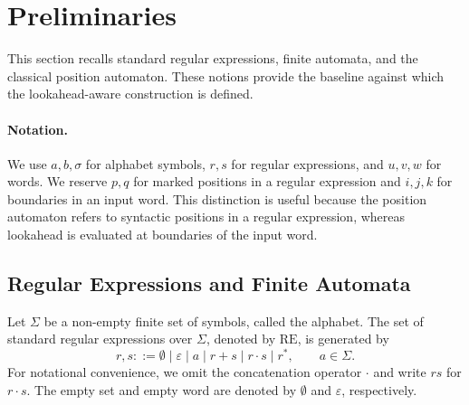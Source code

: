 \section{Preliminaries}
\label{sec:preliminaries}

This section recalls standard regular expressions, finite automata,
and the classical position automaton.  These notions provide the
baseline against which the lookahead-aware construction is defined.

\paragraph{Notation.}
We use \(a,b,\sigma\) for alphabet symbols, \(r,s\) for regular expressions, and \(u,v,w\) for words. We reserve \(p,q\) for marked positions in a regular expression and \(i,j,k\) for boundaries in an input word.  This distinction is useful because the position automaton refers to syntactic positions in a regular expression, whereas lookahead is evaluated at boundaries of the input word.



\subsection{Regular Expressions and Finite Automata}
\label{sec:re-automata}

Let $\Sigma$ be a non-empty finite set of symbols, called the alphabet. The set of standard regular expressions over $\Sigma$, denoted by $\mathrm{RE}$, is generated by
\begin{equation}
r,s ::= 
\emptyset
\mid \varepsilon
\mid a
\mid r+s
\mid r\cdot s
\mid r^*,
\qquad a\in\Sigma.
\label{equation: grammar for standard regex}
\end{equation}
For notational convenience, we omit the concatenation operator $\cdot$ and write $rs$ for $r\cdot s$. The empty set and empty word are denoted by $\emptyset$ and $\varepsilon$, respectively.

